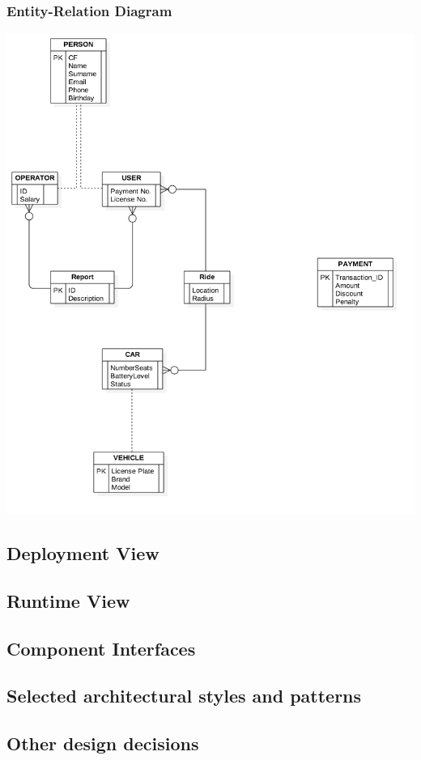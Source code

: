\subsubsection{Entity-Relation Diagram}
\begin{center}
\includegraphics[scale=0.35]{Images/ER/ER.png}
\end{center}
\subsection{Deployment View}

\subsection{Runtime View}
\newpage
\subsection{Component Interfaces}
\newpage
\subsection{Selected architectural styles and patterns}
\newpage
\subsection{Other design decisions}
\newpage